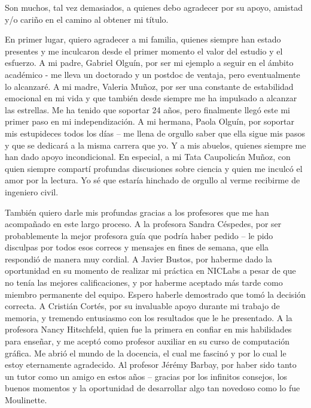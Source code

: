 \begin{thanks}
    Son muchos, tal vez demasiados, a quienes debo agradecer por su apoyo, amistad y/o cariño en el camino al obtener mi título. 
    
    En primer lugar, quiero agradecer a mi familia, quienes siempre han estado presentes y me inculcaron desde el primer momento el valor del estudio y el esfuerzo. 
    A mi padre, Gabriel Olguín, por ser mi ejemplo a seguir en el ámbito académico - me lleva un doctorado y un postdoc de ventaja, pero eventualmente lo alcanzaré. 
    A mi madre, Valeria Muñoz, por ser una constante de estabilidad emocional en mi vida y que también desde siempre me ha impulsado a alcanzar las estrellas. Me ha tenido que soportar 24 años, pero finalmente llegó este mi primer paso en mi independización.
    A mi hermana, Paola Olguín, por soportar mis estupideces todos los días -- me llena de orgullo saber que ella sigue mis pasos y que se dedicará a la misma carrera que yo. Y a mis abuelos, quienes siempre me han dado apoyo incondicional. 
    En especial, a mi Tata Caupolicán Muñoz, con quien siempre compartí profundas discusiones sobre ciencia y quien me inculcó el amor por la lectura. Yo sé que estaría hinchado de orgullo al verme recibirme de ingeniero civil.
    
    También quiero darle mis profundas gracias a los profesores que me han acompañado en este largo proceso. 
    A la profesora Sandra Céspedes, por ser probablemente la mejor profesora guía que podría haber pedido -- le pido disculpas por todos esos correos y mensajes en fines de semana, que ella respondió de manera muy cordial.
    A Javier Bustos, por haberme dado la oportunidad en su momento de realizar mi práctica en NICLabs a pesar de que no tenía las mejores calificaciones, y por haberme aceptado más tarde como miembro permanente del equipo. Espero haberle demostrado que tomó la decisión correcta.   
    A Cristián Cortés, por su invaluable apoyo durante mi trabajo de memoria, y tremendo entusiasmo con los resultados que le he presentado.
    A la profesora Nancy Hitschfeld, quien fue la primera en confiar en mis habilidades para enseñar, y me aceptó como profesor auxiliar en su curso de computación gráfica. Me abrió el mundo de la docencia, el cual me fascinó y por lo cual le estoy eternamente agradecido.
    Al profesor Jérémy Barbay, por haber sido tanto un tutor como un amigo en estos años -- gracias por los infinitos consejos, los buenos momentos y la oportunidad de desarrollar algo tan novedoso como lo fue Moulinette. 
    

\end{thanks}
